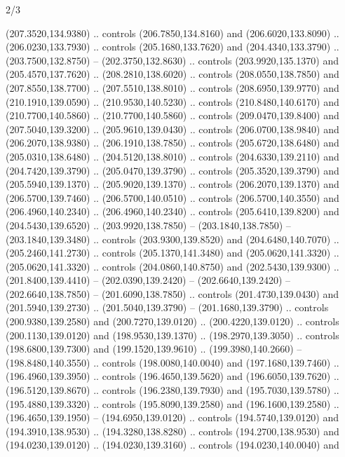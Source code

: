 \begin{flagdescription}{2/3}
\begin{scope}[xshift=0.5\flaglength,yshift=0.5\flagwidth,scale=\flagwidth/259.2]
\begin{scope}[y=0.8pt, x=0.8pt, yscale=-1,shift={(-243,-162)}]
      (207.3520,134.9380) .. controls (206.7850,134.8160) and (206.6020,133.8090) ..
      (206.0230,133.7930) .. controls (205.1680,133.7620) and (204.4340,133.3790) ..
      (203.7500,132.8750) -- (202.3750,132.8630) .. controls (203.9920,135.1370) and
      (205.4570,137.7620) .. (208.2810,138.6020) .. controls (208.0550,138.7850) and
      (207.8550,138.7700) .. (207.5510,138.8010) .. controls (208.6950,139.9770) and
      (210.1910,139.0590) .. (210.9530,140.5230) .. controls (210.8480,140.6170) and
      (210.7700,140.5860) .. (210.7700,140.5860) .. controls (209.0470,139.8400) and
      (207.5040,139.3200) .. (205.9610,139.0430) .. controls (206.0700,138.9840) and
      (206.2070,138.9380) .. (206.1910,138.7850) .. controls (205.6720,138.6480) and
      (205.0310,138.6480) .. (204.5120,138.8010) .. controls (204.6330,139.2110) and
      (204.7420,139.3790) .. (205.0470,139.3790) .. controls (205.3520,139.3790) and
      (205.5940,139.1370) .. (205.9020,139.1370) .. controls (206.2070,139.1370) and
      (206.5700,139.7460) .. (206.5700,140.0510) .. controls (206.5700,140.3550) and
      (206.4960,140.2340) .. (206.4960,140.2340) .. controls (205.6410,139.8200) and
      (204.5430,139.6520) .. (203.9920,138.7850) -- (203.1840,138.7850) --
      (203.1840,139.3480) .. controls (203.9300,139.8520) and (204.6480,140.7070) ..
      (205.2460,141.2730) .. controls (205.1370,141.3480) and (205.0620,141.3320) ..
      (205.0620,141.3320) .. controls (204.0860,140.8750) and (202.5430,139.9300) ..
      (201.8400,139.4410) -- (202.0390,139.2420) -- (202.6640,139.2420) --
      (202.6640,138.7850) -- (201.6090,138.7850) .. controls (201.4730,139.0430) and
      (201.5940,139.2730) .. (201.5040,139.3790) -- (201.1680,139.3790) .. controls
      (200.9380,139.2580) and (200.7270,139.0120) .. (200.4220,139.0120) .. controls
      (200.1130,139.0120) and (198.9530,139.1370) .. (198.2970,139.3050) .. controls
      (198.6800,139.7300) and (199.1520,139.9610) .. (199.3980,140.2660) --
      (198.8480,140.3550) .. controls (198.0080,140.0040) and (197.1680,139.7460) ..
      (196.4960,139.3950) .. controls (196.4650,139.5620) and (196.6050,139.7620) ..
      (196.5120,139.8670) .. controls (196.2380,139.7930) and (195.7030,139.5780) ..
      (195.4880,139.3320) .. controls (195.8090,139.2580) and (196.1600,139.2580) ..
      (196.4650,139.1950) -- (194.6950,139.0120) .. controls (194.5740,139.0120) and
      (194.3910,138.9530) .. (194.3280,138.8280) .. controls (194.2700,138.9530) and
      (194.0230,139.0120) .. (194.0230,139.3160) .. controls (194.0230,140.0040) and

\end{scope}
\end{scope}
\end{flagdescription}
